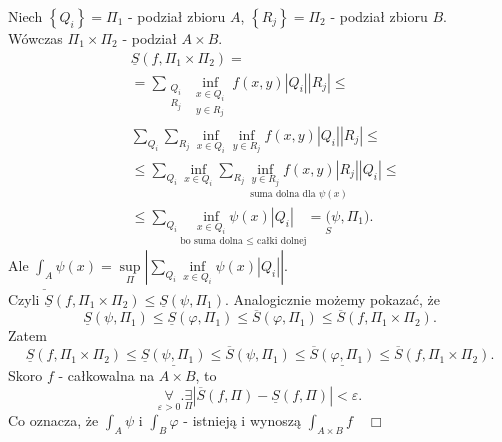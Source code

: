 \documentclass[../main.tex]{subfiles}
\begin{document}
    \begin{dowod}
        Niech $\left\{ Q_i \right\} = \Pi_1$ - podział zbioru $A$, $\left\{ R_j \right\} = \Pi_2$ - podział zbioru $B$.\\
        Wówczas  $\Pi_1 \times \Pi_2$ - podział $A\times B$.
        \begin{align*}
            &\underline{S}(f,\Pi_1\times \Pi_2) = \\
            &= \sum_{\substack{Q_i\\ R_j}} \underset{\substack{x\in Q_i\\ y\in R_j}}{\inf} f(x,y) |Q_i| |R_j| \le\\
            &\sum_{Q_i}\sum_{R_j} \underset{x\in Q_i}{\inf} \underset{y\in R_j}{\inf} f(x,y) |Q_i| |R_j|\le\\
            &\le \sum_{Q_i}\underset{x\in Q_i}{\inf} \underset{\text{suma dolna dla $\psi(x)$}}{\sum_{R_j}\underset{y\in R_j}{\inf} f(x,y) |R_j| |Q_i|}\le\\
            &\le\sum_{Q_i}\underset{\text{bo suma dolna $\le$ całki dolnej}}{\underset{x\in Q_i}{\inf} \psi(x) |Q_i|} = \underset{S}(\psi,\Pi_1)
        .\end{align*}
        Ale $\underline{\int_A}\psi(x) = \underset{\Pi}{\sup} \left| \sum_{Q_i}\underset{x\in Q_i}{\inf} \psi(x) | Q_i | \right|$.\\
        Czyli $\underline{S}(f,\Pi_1\times\Pi_2) \le \underline{S}(\psi,\Pi_1)$. Analogicznie możemy pokazać, że\\
        \[\underline{S}(\psi,\Pi_1)\le\underline{S}(\varphi,\Pi_1)\le\overline{S}(\varphi,\Pi_1) \le\overline{S}(f,\Pi_1\times\Pi_2).\]
        Zatem
        \[
            \underline{S}(f,\Pi_1\times\Pi_2) \le \underline{\underline{S}(\psi,\Pi_1)} \le \overline{S}(\psi, \Pi_1) \le \underline{\overline{S}(\varphi,\Pi_1)} \le \overline{S}(f,\Pi_1\times\Pi_2)
        .\]
        Skoro $f$ - całkowalna na $A\times B$, to
    \[
        \underset{\varepsilon>0}{\forall} .\underset{\Pi}{\exists} |\overline{S}(f,\Pi) - \underline{S}(f,\Pi)|<\varepsilon
    .\]
    Co oznacza, że $\int_A \psi$ i $\int_B \varphi$ - istnieją i wynoszą $\int_{A\times B} f \quad\Box$

    \end{dowod}
\end{document}
